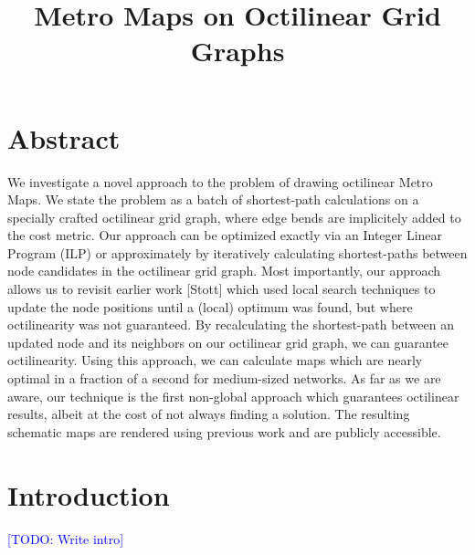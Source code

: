 \documentclass{sig-alternate-sigmod09}
\newcommand\TODO[1]{\textcolor{blue}{\small [TODO: #1]}}
\begin{document}
\title{Metro Maps on Octilinear Grid Graphs}


\maketitle

\section{Abstract}

We investigate a novel approach to the problem of drawing octilinear Metro Maps.
We state the problem as a batch of shortest-path calculations on a specially crafted octilinear grid graph, where edge bends are implicitely added to the cost metric.
Our approach can be optimized exactly via an Integer Linear Program (ILP) or approximately by iteratively calculating shortest-paths between node candidates in the octilinear grid graph.
Most importantly, our approach allows us to revisit earlier work [Stott] which used local search techniques to update the node positions until a (local) optimum was found, but where octilinearity was not guaranteed.
By recalculating the shortest-path between an updated node and its neighbors on our octilinear grid graph, we can guarantee octilinearity.
Using this approach, we can calculate maps which are nearly optimal in a fraction of a second for medium-sized networks.
As far as we are aware, our technique is the first non-global approach which guarantees octilinear results, albeit at the cost of not always finding a solution. The resulting schematic maps are rendered using previous work and are publicly accessible.

\section{Introduction}


\TODO{Write intro}
\end{document}
